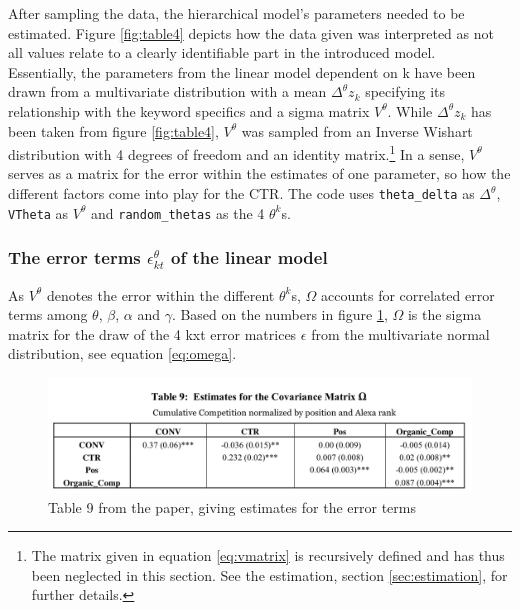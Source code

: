 After sampling the data, the hierarchical model's parameters needed to be estimated. Figure \ref{fig:table4} depicts how the data given was interpreted as not all values relate to a clearly identifiable part in the introduced model.\\
Essentially, the parameters from the linear model dependent on k have been drawn from a multivariate distribution with a mean $\Delta^{\theta}z_k$ specifying its relationship with the keyword specifics and a sigma matrix $V^{\theta}$. While $\Delta^{\theta}z_k$ has been taken from figure \ref{fig:table4}, $V^{\theta}$ was sampled from an Inverse Wishart distribution with 4 degrees of freedom and an identity matrix.\footnote{The matrix given in equation \ref{eq:vmatrix} is recursively defined and has thus been neglected in this section. See the estimation, section \ref{sec:estimation}, for further details.} In a sense, $V^{\theta}$ serves as a matrix for the error within the estimates of one parameter, so how the different factors come into play for the CTR. The code uses \texttt{theta\_delta} as $\Delta^{\theta}$, \texttt{VTheta} as $V^{\theta}$ and \texttt{random\_thetas} as the 4 $\theta^k$s.\\

\newpage


\newpage
\subsubsection{The error terms $\epsilon^{\theta}_{kt}$ of the linear model}
As $V^{\theta}$ denotes the error within the different $\theta^k$s, $\Omega$ accounts for correlated error terms among $\theta$, $\beta$, $\alpha$ and $\gamma$. Based on the numbers in figure \ref{fig:errorterms}, $\Omega$ is the sigma matrix for the draw of the 4 kxt error matrices $\epsilon$ from the multivariate normal distribution, see equation \ref{eq:omega}.\\


\begin{figure}[h!]
    \centering
    \includegraphics[scale=0.35]{errorterms}
    \caption{Table 9 from the paper, giving estimates for the error terms}
    \label{fig:errorterms}
\end{figure}

